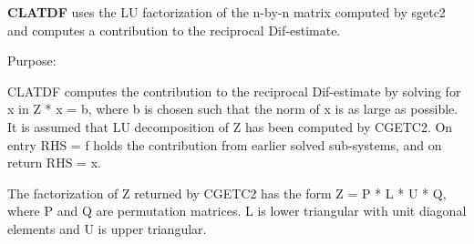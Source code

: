 {\bfseries C\+L\+A\+T\+D\+F} uses the L\+U factorization of the n-\/by-\/n matrix computed by sgetc2 and computes a contribution to the reciprocal Dif-\/estimate. 

 \begin{DoxyParagraph}{Purpose\+: }
\begin{DoxyVerb} CLATDF computes the contribution to the reciprocal Dif-estimate
 by solving for x in Z * x = b, where b is chosen such that the norm
 of x is as large as possible. It is assumed that LU decomposition
 of Z has been computed by CGETC2. On entry RHS = f holds the
 contribution from earlier solved sub-systems, and on return RHS = x.

 The factorization of Z returned by CGETC2 has the form
 Z = P * L * U * Q, where P and Q are permutation matrices. L is lower
 triangular with unit diagonal elements and U is upper triangular.\end{DoxyVerb}
 
\end{DoxyParagraph}

